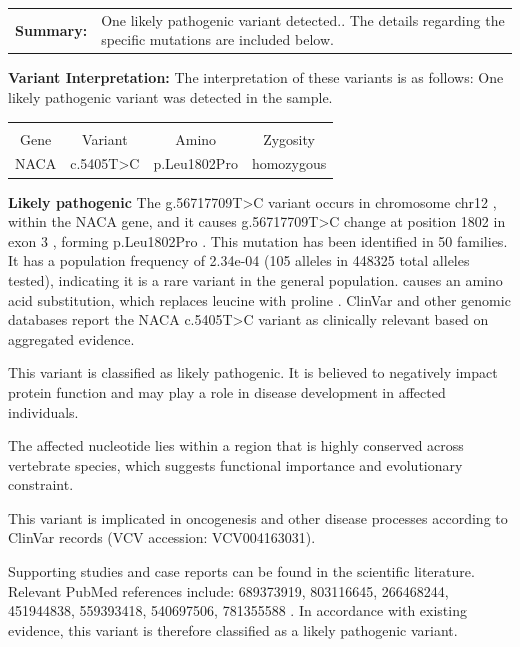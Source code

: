 \documentclass[11pt]{extarticle}
\begin{document}
\begin{tabularx}{\textwidth}{S X}
{\bf \large Summary: } & One likely pathogenic variant detected.. The details regarding the specific mutations are included below. 
\end{tabularx}

\newpage
\vspace{2em}
{\Huge \bf Variant Interpretation: } 
\newline
\newline The interpretation of these variants is as follows: One likely pathogenic variant   was detected in the sample. 

 \vspace{2em}{\bf \large Variant 1 of 1 }
      \newline \vspace{2em} \begin{tabularx}{\textwidth}{C C C C} 
 &&&\\ Gene & Variant & Amino & Zygosity\\ NACA  &  c.5405T>C & p.Leu1802Pro  &  homozygous 
\end{tabularx} \vspace{2em} {\bf Likely pathogenic } \newline
The g.56717709T>C variant occurs in chromosome chr12 , within the NACA gene, and it causes g.56717709T>C change at position 1802 in exon 3 , forming p.Leu1802Pro . This mutation has been identified in 50 families. It has a population frequency of 2.34e-04 (105 alleles in 448325 total alleles tested), indicating it is a rare variant in the general population.
causes an amino acid substitution, which replaces leucine with proline .
ClinVar and other genomic databases report the NACA c.5405T>C variant as clinically relevant based on aggregated evidence. 

 This variant is classified as likely pathogenic. It is believed to negatively impact protein function and may 
        play a role in disease development in affected individuals. 

The affected nucleotide lies within a region 
  that is highly conserved across vertebrate species, which suggests functional importance and evolutionary constraint. 


      This variant is implicated in oncogenesis and other disease processes according to ClinVar records  (VCV accession: VCV004163031). 

Supporting studies and case reports can be found 
  in the scientific literature. Relevant PubMed references include: 689373919, 803116645, 266468244, 451944838, 559393418, 540697506, 781355588 . \newpage
In accordance with existing evidence, this variant is therefore classified as a likely pathogenic variant.
\end{document}
